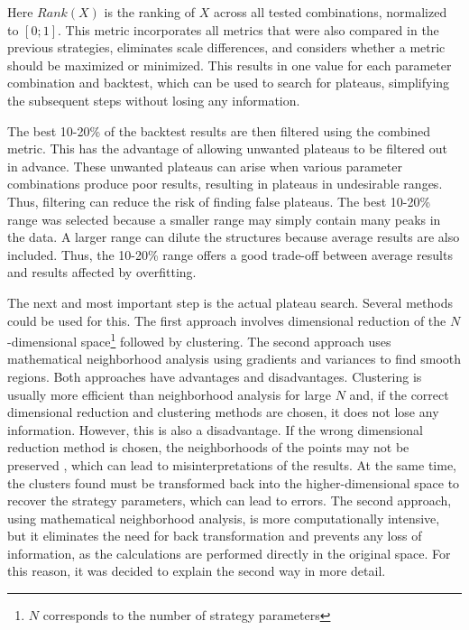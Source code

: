 \noindent
Here $Rank(X)$ is the ranking of $X$ across all tested combinations, normalized to $[0; 1]$.
This metric incorporates all metrics that were also compared in the previous strategies, eliminates scale differences, and considers whether a metric should be maximized or minimized.
This results in one value for each parameter combination and backtest, which can be used to search for plateaus, simplifying the subsequent steps without losing any information.

The best 10-20\% of the backtest results are then filtered using the combined metric.
This has the advantage of allowing unwanted plateaus to be filtered out in advance.
These unwanted plateaus can arise when various parameter combinations produce poor results, resulting in plateaus in undesirable ranges.
Thus, filtering can reduce the risk of finding false plateaus.
The best 10-20\% range was selected because a smaller range may simply contain many peaks in the data.
A larger range can dilute the structures because average results are also included.
Thus, the 10-20\% range offers a good trade-off between average results and results affected by overfitting.

The next and most important step is the actual plateau search.
Several methods could be used for this.
The first approach involves dimensional reduction of the $N$-dimensional space\footnote{$N$ corresponds to the number of strategy parameters} followed by clustering.
The second approach uses mathematical neighborhood analysis using gradients and variances to find smooth regions.
Both approaches have advantages and disadvantages.
Clustering is usually more efficient than neighborhood analysis for large $N$ \cite{cluster-neighbors} and, if the correct dimensional reduction and clustering methods are chosen, it does not lose any information.
However, this is also a disadvantage.
If the wrong dimensional reduction method is chosen, the neighborhoods of the points may not be preserved \cite{cluster-neighbors}, which can lead to misinterpretations of the results.
At the same time, the clusters found must be transformed back into the higher-dimensional space to recover the strategy parameters, which can lead to errors.
The second approach, using mathematical neighborhood analysis, is more computationally intensive, but it eliminates the need for back transformation and prevents any loss of information, as the calculations are performed directly in the original space.
For this reason, it was decided to explain the second way in more detail.

